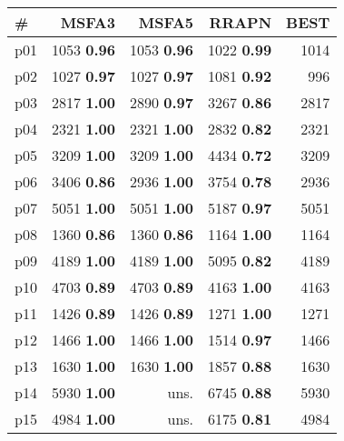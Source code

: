 \begin{tabular}{|l|rrr|r|}
\hline
\textbf{\#} & \textbf{MSFA3} & \textbf{MSFA5} & \textbf{RRAPN} & \textbf{BEST}\\
\hline
p01 & {\footnotesize 1053} \textbf{0.96} & {\footnotesize 1053} \textbf{0.96} & {\footnotesize 1022} \textbf{0.99} & 1014\\
p02 & {\footnotesize 1027} \textbf{0.97} & {\footnotesize 1027} \textbf{0.97} & {\footnotesize 1081} \textbf{0.92} & 996\\
p03 & {\footnotesize 2817} \textbf{1.00} & {\footnotesize 2890} \textbf{0.97} & {\footnotesize 3267} \textbf{0.86} & 2817\\
p04 & {\footnotesize 2321} \textbf{1.00} & {\footnotesize 2321} \textbf{1.00} & {\footnotesize 2832} \textbf{0.82} & 2321\\
p05 & {\footnotesize 3209} \textbf{1.00} & {\footnotesize 3209} \textbf{1.00} & {\footnotesize 4434} \textbf{0.72} & 3209\\
p06 & {\footnotesize 3406} \textbf{0.86} & {\footnotesize 2936} \textbf{1.00} & {\footnotesize 3754} \textbf{0.78} & 2936\\
p07 & {\footnotesize 5051} \textbf{1.00} & {\footnotesize 5051} \textbf{1.00} & {\footnotesize 5187} \textbf{0.97} & 5051\\
p08 & {\footnotesize 1360} \textbf{0.86} & {\footnotesize 1360} \textbf{0.86} & {\footnotesize 1164} \textbf{1.00} & 1164\\
p09 & {\footnotesize 4189} \textbf{1.00} & {\footnotesize 4189} \textbf{1.00} & {\footnotesize 5095} \textbf{0.82} & 4189\\
p10 & {\footnotesize 4703} \textbf{0.89} & {\footnotesize 4703} \textbf{0.89} & {\footnotesize 4163} \textbf{1.00} & 4163\\
p11 & {\footnotesize 1426} \textbf{0.89} & {\footnotesize 1426} \textbf{0.89} & {\footnotesize 1271} \textbf{1.00} & 1271\\
p12 & {\footnotesize 1466} \textbf{1.00} & {\footnotesize 1466} \textbf{1.00} & {\footnotesize 1514} \textbf{0.97} & 1466\\
p13 & {\footnotesize 1630} \textbf{1.00} & {\footnotesize 1630} \textbf{1.00} & {\footnotesize 1857} \textbf{0.88} & 1630\\
p14 & {\footnotesize 5930} \textbf{1.00} & uns. & {\footnotesize 6745} \textbf{0.88} & 5930\\
p15 & {\footnotesize 4984} \textbf{1.00} & uns. & {\footnotesize 6175} \textbf{0.81} & 4984\\

\end{tabular}
